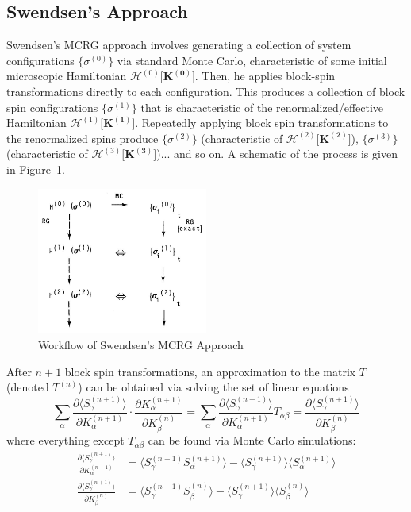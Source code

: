 \documentclass[12pt]{article}
\renewcommand{\vec}[1]{\mathbf{#1}}
\begin{document}
\subsection{Swendsen's Approach}
Swendsen's MCRG approach involves generating a collection of system configurations $\{\sigma^{(0)}\}$ via standard Monte Carlo, characteristic of some initial microscopic Hamiltonian $\mathcal{H}^{(0)}[\vec{K^{(0)}]}$. Then, he applies block-spin transformations directly to each configuration. This produces a collection of block spin
configurations $\{\sigma^{(1)}\}$ that is characteristic of the renormalized/effective Hamiltonian $\mathcal{H}^{(1)}[\vec{K^{(1)}]}$. Repeatedly applying block spin transformations to the renormalized spins produce $\{\sigma^{(2)}\}$ (characteristic of $\mathcal{H}^{(2)}[\vec{K^{(2)}]}$), $\{\sigma^{(3)}\}$ (characteristic of $\mathcal{H}^{(3)}[\vec{K^{(3)}]}$)... and so on. A schematic of the process is given in Figure~\ref{idea}.
\begin{figure}[H]
\centering
\includegraphics[width=0.5\textwidth]{idea}
\caption{Workflow of Swendsen's MCRG Approach}
\label{idea}
\end{figure}

After $n+1$ block spin transformations, an approximation to the matrix $T$ (denoted $T^{(n)}$) can be obtained via solving the set of linear equations
\begin{equation}
\sum_{\alpha}\frac{\partial \langle S_\gamma^{(n+1)}\rangle}{\partial K_\alpha^{(n+1)}}\cdot \frac{\partial K_\alpha^{(n+1)}}{\partial K_\beta^{(n)}} = \sum_{\alpha}\frac{\partial \langle S_\gamma^{(n+1)}\rangle}{\partial K_\alpha^{(n+1)}} T_{\alpha\beta} = \frac{\partial \langle S_\gamma^{(n+1)}\rangle}{\partial K_\beta^{(n)}} \label{LinRGMat}
\end{equation}
where everything except $T_{\alpha\beta}$ can be found via Monte Carlo simulations:
\begin{align}
\frac{\partial \langle S_\gamma^{(n+1)}\rangle}{\partial K_\alpha^{(n+1)}} &= \langle S_\gamma^{(n+1)}S_\alpha^{(n+1)}\rangle - \langle S_\gamma^{(n+1)} \rangle \langle S_\alpha^{(n+1)}\rangle\\
\frac{\partial \langle S_\gamma^{(n+1)}\rangle}{\partial K_\beta^{(n)}} &= \langle S_\gamma^{(n+1)}S_\beta^{(n)}\rangle - \langle S_\gamma^{(n+1)} \rangle \langle S_\beta^{(n)}\rangle
\end{align}
\end{document}
